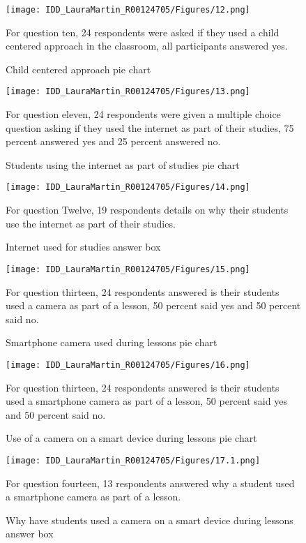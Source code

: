 \begin{figure}[ht]
\centering
\texttt{[image: IDD\_LauraMartin\_R00124705/Figures/12.png]}
\caption{Child centered approach pie chart}
{For question ten, 24 respondents were asked if they used a child centered approach in the classroom, all participants answered yes.}
\end{figure}

\begin{figure}[ht]
\centering
\texttt{[image: IDD\_LauraMartin\_R00124705/Figures/13.png]}
\caption{Students using the internet as part of studies pie chart}
{For question eleven, 24 respondents were given a multiple choice question asking if they used the internet as part of their studies, 75 percent answered yes and 25 percent answered no.}
\end{figure}

\begin{figure}[ht]
\centering
\texttt{[image: IDD\_LauraMartin\_R00124705/Figures/14.png]}
\caption{Internet used for studies answer box}
{For question Twelve, 19 respondents details on why their students use the internet as part of their studies.}
\end{figure}

\begin{figure}[ht]
\centering
\texttt{[image: IDD\_LauraMartin\_R00124705/Figures/15.png]}
\caption{Smartphone camera used during lessons pie chart}
{For question thirteen, 24 respondents answered is their students used a camera as part of a lesson, 50 percent said yes and 50 percent said no.}
\end{figure}

\begin{figure}[ht]
\centering
\texttt{[image: IDD\_LauraMartin\_R00124705/Figures/16.png]}
\caption{Use of a camera on a smart device during lessons pie chart}
{For question thirteen, 24 respondents answered is their students used a smartphone camera as part of a lesson, 50 percent said yes and 50 percent said no.}
\end{figure}

\begin{figure}[ht]
\centering
\texttt{[image: IDD\_LauraMartin\_R00124705/Figures/17.1.png]}
\caption{Why have students used a camera on a smart device during lessons answer box}
{For question fourteen, 13 respondents answered why a student used a smartphone camera as part of a lesson.}
\end{figure}

